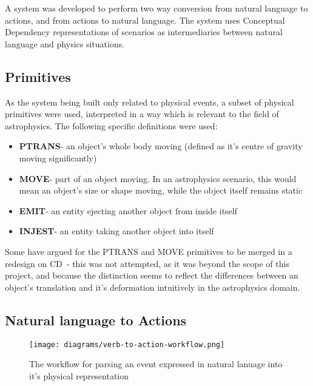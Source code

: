 \documentclass[dissertation.tex]{subfiles}
\begin{document}

    A system was developed to perform two way conversion from natural language to actions, and from actions to natural language. The system uses Conceptual Dependency representations of scenarios as intermediaries between natural language and physics situations.

    \subsection{Primitives}
    As the system being built only related to physical events, a subset of physical primitives were used, interpreted in a way which is relevant to the field of astrophysics. The following specific definitions were used:
    \begin{itemize}
        \item \textbf{PTRANS}- an object's whole body moving (defined as it's centre of gravity moving significantly)
        \item \textbf{MOVE}- part of an object moving. In an astrophysics scenario, this would mean an object's size or shape moving, while the object itself remains static %
        \item \textbf{EMIT}- an entity ejecting another object from inside itself
        \item \textbf{INJEST}- an entity taking another object into itself
    \end{itemize}

    Some have argued for the PTRANS and MOVE primitives to be merged in a redesign on CD~\cite{macbethimage}- this was not attempted, as it was beyond the scope of this project, and because the distinction seems to reflect the differences between an object's translation and it's deformation intuitively in the astrophysics domain.

    \subsection{Natural language to Actions}

    \begin{figure}[h]
        \begin{center}
            \texttt{[image: diagrams/verb-to-action-workflow.png]}
        \end{center}
        \caption{The workflow for parsing an event expressed in natural lanuage into it's physical representation}
    \end{figure}
\end{document}
